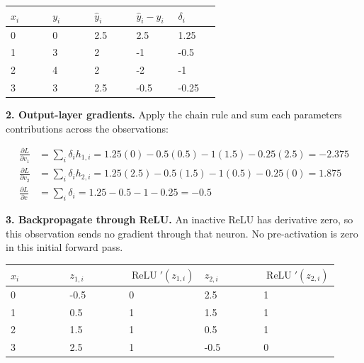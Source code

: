 \documentclass{course_sheet}
\begin{document}
\begin{center}

\begingroup
\setlength{\tabcolsep}{3pt}
\small
\begin{tabular}{@{}p{0.185\linewidth}p{0.185\linewidth}p{0.185\linewidth}p{0.185\linewidth}p{0.185\linewidth}@{}}
\toprule
$x_i$ & $y_i$ & $\hat y_i$ & $\hat y_i-y_i$ & $\delta_i$ \\
\midrule
0 & 0 & 2.5 & 2.5 & 1.25 \\
1 & 3 & 2 & -1 & -0.5 \\
2 & 4 & 2 & -2 & -1 \\
3 & 3 & 2.5 & -0.5 & -0.25 \\
\bottomrule
\end{tabular}
\endgroup

\end{center}

\textbf{2. Output-layer gradients.} Apply the chain rule and sum each
parameter\textquotesingle s contributions across the observations:

\begin{equation*}
\begin{split}
\frac{\partial L}{\partial v_1}&=\sum_i\delta_i h_{1,i}
=1.25(0)-0.5(0.5)-1(1.5)-0.25(2.5)=-2.375\\
\frac{\partial L}{\partial v_2}&=\sum_i\delta_i h_{2,i}
=1.25(2.5)-0.5(1.5)-1(0.5)-0.25(0)=1.875\\
\frac{\partial L}{\partial c}&=\sum_i\delta_i=1.25-0.5-1-0.25=-0.5
\end{split}
\end{equation*}

\textbf{3. Backpropagate through ReLU.} An inactive ReLU has derivative
zero, so this observation sends no gradient through that neuron. No
pre-activation is zero in this initial forward pass.

\begin{center}

\begingroup
\setlength{\tabcolsep}{3pt}
\small
\begin{tabular}{@{}p{0.185\linewidth}p{0.185\linewidth}p{0.185\linewidth}p{0.185\linewidth}p{0.185\linewidth}@{}}
\toprule
$x_i$ & $z_{1,i}$ & $\operatorname{ReLU}'(z_{1,i})$ & $z_{2,i}$ & $\operatorname{ReLU}'(z_{2,i})$ \\
\midrule
0 & -0.5 & 0 & 2.5 & 1 \\
1 & 0.5 & 1 & 1.5 & 1 \\
2 & 1.5 & 1 & 0.5 & 1 \\
3 & 2.5 & 1 & -0.5 & 0 \\
\bottomrule
\end{tabular}
\endgroup

\end{center}
\end{document}
